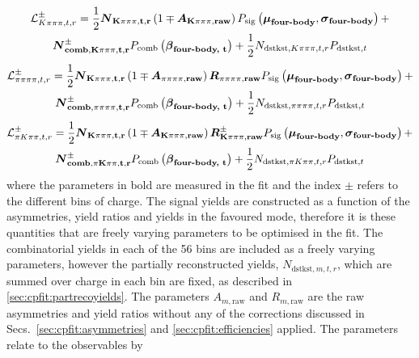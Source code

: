 \begin{multline}
\mathcal{L}_{K\pi\pi\pi, t, r}^{\pm} = \frac{1}{2}\mathbf{\boldsymbol N_{K\pi\pi\pi, t, r}}\left(1 \mp \mathbf{\boldsymbol A_{K\pi\pi\pi, raw}}\right)P_{\text{sig}}\left(\mathbf{\boldsymbol\mu_\text{\textbf{four-body}}},\mathbf{\boldsymbol\sigma_\text{\textbf{four-body}}}\right) + \\ \mathbf{\boldsymbol N_{\textbf{comb}, K\pi\pi\pi, t, r}^{\pm}}P_{\text{comb}}\left(\mathbf{\boldsymbol\beta_\text{\textbf{four-body, t}}}\right) + \frac{1}{2}N_{\text{dstkst}, K\pi\pi\pi, t, r}P_{\text{dstkst}, t}
\end{multline}
\begin{multline}
\mathcal{L}_{\pi\pi\pi\pi, t, r}^{\pm} = \frac{1}{2}\mathbf{\boldsymbol N_{K\pi\pi\pi, t, r}}\left(1 \mp \mathbf{\boldsymbol A_{\pi\pi\pi\pi, raw}}\right)\mathbf{\boldsymbol R_{\pi\pi\pi\pi, raw}} P_{\text{sig}}\left(\mathbf{\boldsymbol\mu_\text{\textbf{four-body}}},\mathbf{\boldsymbol\sigma_\text{\textbf{four-body}}}\right) + \\ \mathbf{\boldsymbol N_{\textbf{comb}, \pi\pi\pi\pi, t, r}^{\pm}}P_{\text{comb}}\left(\mathbf{\boldsymbol\beta_\text{\textbf{four-body, t}}}\right) + \frac{1}{2}N_{\text{dstkst}, \pi\pi\pi\pi, t, r}P_{\text{dstkst}, t}
\end{multline}
\begin{multline}
\mathcal{L}_{\pi K\pi\pi, t, r}^{\pm} = \frac{1}{2}\mathbf{\boldsymbol N_{K\pi\pi\pi, t, r}}\left(1 \mp \mathbf{\boldsymbol A_{K\pi\pi\pi, raw}}\right)\mathbf{\boldsymbol R_{K\pi\pi\pi, raw}^{\pm}} P_{\text{sig}}\left(\mathbf{\boldsymbol\mu_\text{\textbf{four-body}}},\mathbf{\boldsymbol\sigma_\text{\textbf{four-body}}}\right) + \\ \mathbf{\boldsymbol N_{\textbf{comb}, \pi K\pi\pi, t, r}^{\pm}}P_{\text{comb}}\left(\mathbf{\boldsymbol\beta_\text{\textbf{four-body, t}}}\right) + \frac{1}{2}N_{\text{dstkst}, \pi K\pi\pi, t, r}P_{\text{dstkst}, t}
\label{pikpipilikelihood}
\end{multline}
where the parameters in bold are measured in the fit and the index $\pm$ refers to the different bins of \B charge. The signal yields are constructed as a function of the asymmetries, yield ratios and yields in the favoured mode, therefore it is these quantities that are freely varying parameters to be optimised in the \CP fit. The combinatorial yields in each of the 56 bins are included as a freely varying parameters, however the partially reconstructed yields, $N_{\text{dstkst}, m, t, r}$, which are summed over charge in each bin are fixed, as described in \sect\ref{sec:cpfit:partrecoyields}. The parameters $A_{m, \text{raw}}$ and $R_{m, \text{raw}}$ are the raw asymmetries and yield ratios without any of the corrections discussed in Secs.~\ref{sec:cpfit:asymmetries} and \ref{sec:cpfit:efficiencies} applied. The parameters relate to the \CP observables by

